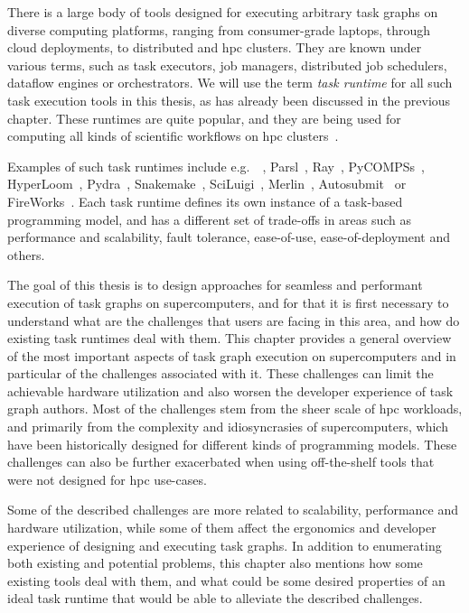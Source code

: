 There is a large body of tools designed for executing arbitrary task graphs on diverse computing
platforms, ranging from consumer-grade laptops, through cloud deployments, to distributed and
\gls{hpc} clusters. They are known under various terms, such as task executors,
job managers, distributed job schedulers, dataflow engines or orchestrators. We will use the term
\emph{task runtime} for all such task execution tools in this thesis, as has already been
discussed in the previous chapter. These runtimes are quite popular, and they are being used for
computing all kinds of scientific workflows on \gls{hpc}
clusters~\cite{hpc_tasks, hpc_tasks_2, hpc_tasks_3, pegasus}.

Examples of such task runtimes include e.g.\ \dask{}~\cite{dask},
Parsl~\cite{parsl}, Ray~\cite{ray},
PyCOMPSs~\cite{pycompss}, HyperLoom~\cite{hyperloom},
Pydra~\cite{pydra}, Snakemake~\cite{snakemake},
SciLuigi~\cite{sciluigi}, Merlin~\cite{merlin},
Autosubmit~\cite{autosubmit} or FireWorks~\cite{fireworks}. Each task runtime
defines its own instance of a task-based programming model, and has a different set of trade-offs
in areas such as performance and scalability, fault tolerance, ease-of-use, ease-of-deployment and
others.

The goal of this thesis is to design approaches for seamless and performant execution of task
graphs on supercomputers, and for that it is first necessary to understand what are the challenges
that users are facing in this area, and how do existing task runtimes deal with them. This chapter
provides a general overview of the most important aspects of task graph execution on supercomputers
and in particular of the challenges associated with it. These challenges can limit the achievable
hardware utilization and also worsen the developer experience of task graph authors. Most of the
challenges stem from the sheer scale of \gls{hpc} workloads, and primarily from
the complexity and idiosyncrasies of supercomputers, which have been historically designed for
different kinds of programming models. These challenges can also be further exacerbated when using
off-the-shelf tools that were not designed for \gls{hpc} use-cases.

Some of the described challenges are more related to scalability, performance and hardware
utilization, while some of them affect the ergonomics and developer experience of designing and
executing task graphs. In addition to enumerating both existing and potential problems, this
chapter also mentions how some existing tools deal with them, and what could be some desired
properties of an ideal task runtime that would be able to alleviate the described challenges.

